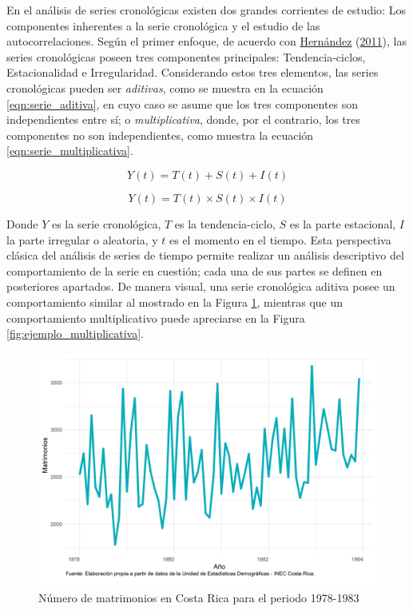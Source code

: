 \documentclass[
]{article}
\begin{document}
En el análisis de series cronológicas existen dos grandes corrientes de
estudio: Los componentes inherentes a la serie cronológica y el estudio
de las autocorrelaciones. Según el primer enfoque, de acuerdo con
\protect\hyperlink{ref-oscarh-1}{Hernández}
(\protect\hyperlink{ref-oscarh-1}{2011}), las series cronológicas poseen
tres componentes principales: Tendencia-ciclos, Estacionalidad e
Irregularidad. Considerando estos tres elementos, las series
cronológicas pueden ser \emph{aditivas}, como se muestra en la ecuación
\ref{eqn:serie_aditiva}, en cuyo caso se asume que los tres componentes
son independientes entre sí; o \emph{multiplicativa}, donde, por el
contrario, los tres componentes no son independientes, como muestra la
ecuación \ref{eqn:serie_multiplicativa}.

\newpage

\begin{equation}
\label{eqn:serie_aditiva}
Y(t)=T(t)+S(t)+I(t)
\end{equation}

\begin{equation}
\label{eqn:serie_multiplicativa}
Y(t)=T(t)\times S(t)\times I(t)
\end{equation}

Donde \(Y\) es la serie cronológica, \(T\) es la tendencia-ciclo, \(S\)
es la parte estacional, \(I\) la parte irregular o aleatoria, y \(t\) es
el momento en el tiempo. Esta perspectiva clásica del análisis de series
de tiempo permite realizar un análisis descriptivo del comportamiento de
la serie en cuestión; cada una de sus partes se definen en posteriores
apartados. De manera visual, una serie cronológica aditiva posee un
comportamiento similar al mostrado en la Figura
\ref{fig:ejemplo_aditiva}, mientras que un comportamiento multiplicativo
puede apreciarse en la Figura \ref{fig:ejemplo_multiplicativa}.

\begin{figure}[H]
\includegraphics[width=1\linewidth,height=1\textheight]{Tesis_files/figure-latex/ejemplo_aditiva-1} \caption{Número de matrimonios en Costa Rica para el periodo 1978-1983}\label{fig:ejemplo_aditiva}
\end{figure}
\end{document}
